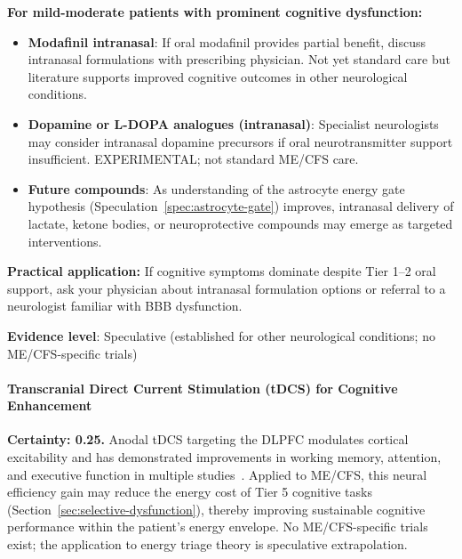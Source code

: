 \begin{recommendation}
\label{rec:intranasal-mild-moderate}

\textbf{For mild-moderate patients with prominent cognitive dysfunction:}

\begin{itemize}
    \item \textbf{Modafinil intranasal}: If oral modafinil provides partial benefit, discuss intranasal formulations with prescribing physician. Not yet standard care but literature supports improved cognitive outcomes in other neurological conditions.

    \item \textbf{Dopamine or L-DOPA analogues (intranasal)}: Specialist neurologists may consider intranasal dopamine precursors if oral neurotransmitter support insufficient. EXPERIMENTAL; not standard ME/CFS care.

    \item \textbf{Future compounds}: As understanding of the astrocyte energy gate hypothesis (Speculation~\ref{spec:astrocyte-gate}) improves, intranasal delivery of lactate, ketone bodies, or neuroprotective compounds may emerge as targeted interventions.
\end{itemize}

\textbf{Practical application:} If cognitive symptoms dominate despite Tier 1--2 oral support, ask your physician about intranasal formulation options or referral to a neurologist familiar with BBB dysfunction.

\textbf{Evidence level}: Speculative (established for other neurological conditions; no ME/CFS-specific trials)

\end{recommendation}

\paragraph{Transcranial Direct Current Stimulation (tDCS) for Cognitive Enhancement}

\begin{speculation}
\label{spec:tdcs-dlpfc-energy}
\textbf{Certainty: 0.25.} Anodal tDCS targeting the DLPFC modulates cortical excitability and has demonstrated improvements in working memory, attention, and executive function in multiple studies~\cite{Li2022tDCS}. Applied to ME/CFS, this neural efficiency gain may reduce the energy cost of Tier 5 cognitive tasks (Section~\ref{sec:selective-dysfunction}), thereby improving sustainable cognitive performance within the patient's energy envelope. No ME/CFS-specific trials exist; the application to energy triage theory is speculative extrapolation.
\end{speculation}

